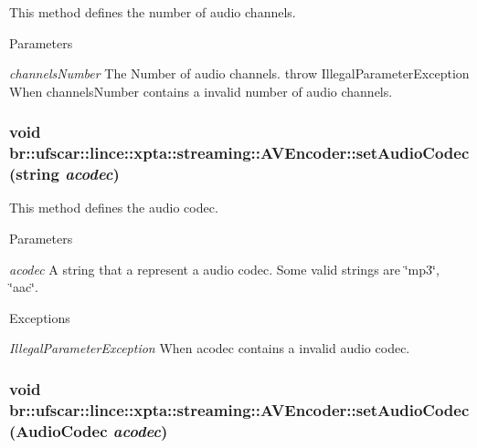 This method defines the number of audio channels. 


\begin{DoxyParams}{Parameters}
\item[{\em channelsNumber}]The Number of audio channels. throw IllegalParameterException When channelsNumber contains a invalid number of audio channels. \end{DoxyParams}
\hypertarget{classbr_1_1ufscar_1_1lince_1_1xpta_1_1streaming_1_1AVEncoder_aec4925cdba6f2a4c5776f196e2cc6100}{
\subsubsection[{setAudioCodec}]{\setlength{\rightskip}{0pt plus 5cm}void br::ufscar::lince::xpta::streaming::AVEncoder::setAudioCodec (string {\em acodec})}}
\label{classbr_1_1ufscar_1_1lince_1_1xpta_1_1streaming_1_1AVEncoder_aec4925cdba6f2a4c5776f196e2cc6100}


This method defines the audio codec. 


\begin{DoxyParams}{Parameters}
\item[{\em acodec}]A string that a represent a audio codec. Some valid strings are \char`\"{}mp3\char`\"{}, \char`\"{}aac\char`\"{}. \end{DoxyParams}

\begin{DoxyExceptions}{Exceptions}
\item[{\em IllegalParameterException}]When acodec contains a invalid audio codec. \end{DoxyExceptions}
\hypertarget{classbr_1_1ufscar_1_1lince_1_1xpta_1_1streaming_1_1AVEncoder_a9a501788c30ee13b6f79053e5f94d21f}{
\subsubsection[{setAudioCodec}]{\setlength{\rightskip}{0pt plus 5cm}void br::ufscar::lince::xpta::streaming::AVEncoder::setAudioCodec ({\bf AudioCodec} {\em acodec})}}
\label{classbr_1_1ufscar_1_1lince_1_1xpta_1_1streaming_1_1AVEncoder_a9a501788c30ee13b6f79053e5f94d21f}


